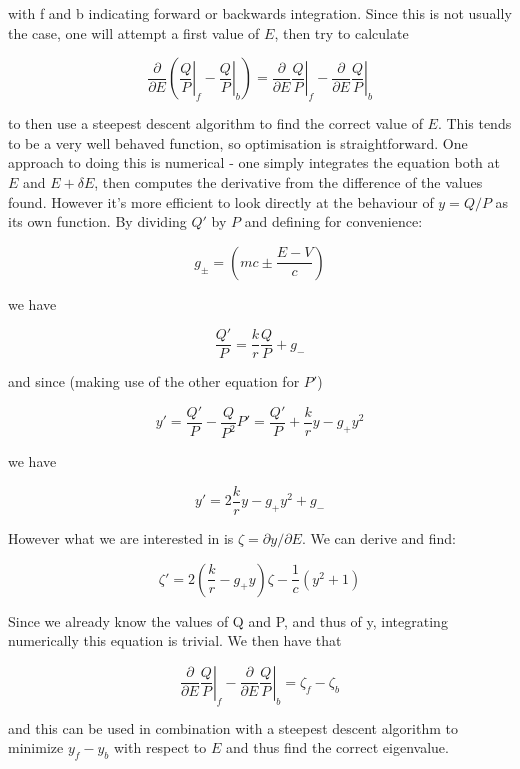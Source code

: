 \documentclass[]{report}
\begin{document}
with f and b indicating forward or backwards integration. Since this is not usually the case, one will attempt a first value of $E$, then try to calculate 

\begin{equation}
\frac{\partial}{\partial E}\left(\left. \frac{Q}{P}\right|_f - \left. \frac{Q}{P}\right|_b\right) = 
\frac{\partial}{\partial E}\left. \frac{Q}{P}\right|_f - \frac{\partial}{\partial E}\left. \frac{Q}{P}\right|_b
\end{equation}

to then use a steepest descent algorithm to find the correct value of $E$. This tends to be a very well behaved function, so optimisation is straightforward. One approach to doing this is numerical - one simply integrates the equation both at $E$ and $E+\delta E$, then computes the derivative from the difference of the values found. However it's more efficient to look directly at the behaviour of $y = Q/P$ as its own function. By dividing $Q'$ by $P$ and defining for convenience:

\begin{equation}
g_\pm = \left(mc\pm\frac{E-V}{c}\right)
\end{equation}

we have

\begin{equation}
\frac{Q'}{P} = \frac{k}{r}\frac{Q}{P}+g_-
\end{equation}

and since (making use of the other equation for $P'$)

\begin{equation}
y' = \frac{Q'}{P} - \frac{Q}{P^2}P' = \frac{Q'}{P} + \frac{k}{r} y -g_+y^2
\end{equation}

we have

\begin{equation}
y' = 2\frac{k}{r}y-g_+y^2+g_-
\end{equation}

However what we are interested in is $\zeta = \partial y / \partial E$. We can derive and find:

\begin{equation}
\zeta' = 2\left(\frac{k}{r}-g_+y\right)\zeta-\frac{1}{c}(y^2+1)
\end{equation}

Since we already know the values of Q and P, and thus of y, integrating numerically this equation is trivial. We then have that

\begin{equation}
\frac{\partial}{\partial E}\left. \frac{Q}{P}\right|_f - \frac{\partial}{\partial E}\left. \frac{Q}{P}\right|_b = \zeta_f-\zeta_b
\end{equation}

and this can be used in combination with a steepest descent algorithm to minimize $y_f-y_b$ with respect to $E$ and thus find the correct eigenvalue.




\end{document}
